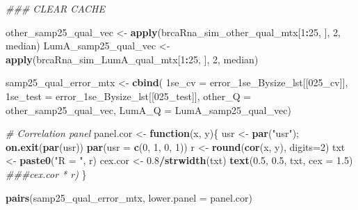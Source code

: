 \documentclass[
]{book}
\newenvironment{Shaded}{\begin{snugshade}}{\end{snugshade}}
\newcommand{\CommentTok}[1]{\textcolor[rgb]{0.56,0.35,0.01}{\textit{#1}}}
\newcommand{\ControlFlowTok}[1]{\textcolor[rgb]{0.13,0.29,0.53}{\textbf{#1}}}
\newcommand{\DataTypeTok}[1]{\textcolor[rgb]{0.13,0.29,0.53}{#1}}
\newcommand{\DecValTok}[1]{\textcolor[rgb]{0.00,0.00,0.81}{#1}}
\newcommand{\FloatTok}[1]{\textcolor[rgb]{0.00,0.00,0.81}{#1}}
\newcommand{\KeywordTok}[1]{\textcolor[rgb]{0.13,0.29,0.53}{\textbf{#1}}}
\newcommand{\NormalTok}[1]{#1}
\newcommand{\OperatorTok}[1]{\textcolor[rgb]{0.81,0.36,0.00}{\textbf{#1}}}
\newcommand{\StringTok}[1]{\textcolor[rgb]{0.31,0.60,0.02}{#1}}
\begin{document}
\begin{Shaded}
\begin{Highlighting}[]
\CommentTok{\#\#\# CLEAR CACHE}


\NormalTok{other\_samp25\_qual\_vec <{-}}\StringTok{ }\KeywordTok{apply}\NormalTok{(brcaRna\_sim\_other\_qual\_mtx[}\DecValTok{1}\OperatorTok{:}\DecValTok{25}\NormalTok{, ], }\DecValTok{2}\NormalTok{, median)}
\NormalTok{LumA\_samp25\_qual\_vec <{-}}\StringTok{ }\KeywordTok{apply}\NormalTok{(brcaRna\_sim\_LumA\_qual\_mtx[}\DecValTok{1}\OperatorTok{:}\DecValTok{25}\NormalTok{, ], }\DecValTok{2}\NormalTok{, median)}

\NormalTok{samp25\_qual\_error\_mtx <{-}}\StringTok{ }\KeywordTok{cbind}\NormalTok{(}
   \StringTok{\textasciigrave{}}\DataTypeTok{1se\_cv}\StringTok{\textasciigrave{}}\NormalTok{ =}\StringTok{ }\NormalTok{error\_1se\_Bysize\_lst[[}\StringTok{\textquotesingle{}025\_cv\textquotesingle{}}\NormalTok{]],}
   \StringTok{\textasciigrave{}}\DataTypeTok{1se\_test}\StringTok{\textasciigrave{}}\NormalTok{ =}\StringTok{ }\NormalTok{error\_1se\_Bysize\_lst[[}\StringTok{\textquotesingle{}025\_test\textquotesingle{}}\NormalTok{]],}
   \StringTok{\textasciigrave{}}\DataTypeTok{other\_Q}\StringTok{\textasciigrave{}}\NormalTok{ =}\StringTok{ }\NormalTok{other\_samp25\_qual\_vec,}
   \StringTok{\textasciigrave{}}\DataTypeTok{LumA\_Q}\StringTok{\textasciigrave{}}\NormalTok{ =}\StringTok{ }\NormalTok{LumA\_samp25\_qual\_vec)}
 

\CommentTok{\# Correlation panel}
\NormalTok{panel.cor <{-}}\StringTok{ }\ControlFlowTok{function}\NormalTok{(x, y)\{}
\NormalTok{    usr <{-}}\StringTok{ }\KeywordTok{par}\NormalTok{(}\StringTok{"usr"}\NormalTok{); }\KeywordTok{on.exit}\NormalTok{(}\KeywordTok{par}\NormalTok{(usr))}
    \KeywordTok{par}\NormalTok{(}\DataTypeTok{usr =} \KeywordTok{c}\NormalTok{(}\DecValTok{0}\NormalTok{, }\DecValTok{1}\NormalTok{, }\DecValTok{0}\NormalTok{, }\DecValTok{1}\NormalTok{))}
\NormalTok{    r <{-}}\StringTok{ }\KeywordTok{round}\NormalTok{(}\KeywordTok{cor}\NormalTok{(x, y), }\DataTypeTok{digits=}\DecValTok{2}\NormalTok{)}
\NormalTok{    txt <{-}}\StringTok{ }\KeywordTok{paste0}\NormalTok{(}\StringTok{"R = "}\NormalTok{, r)}
\NormalTok{    cex.cor <{-}}\StringTok{ }\FloatTok{0.8}\OperatorTok{/}\KeywordTok{strwidth}\NormalTok{(txt)}
    \KeywordTok{text}\NormalTok{(}\FloatTok{0.5}\NormalTok{, }\FloatTok{0.5}\NormalTok{, txt, }\DataTypeTok{cex =} \FloatTok{1.5}\NormalTok{) }\CommentTok{\#\#\#cex.cor * r)}
\NormalTok{\}}

\KeywordTok{pairs}\NormalTok{(samp25\_qual\_error\_mtx,}
 \DataTypeTok{lower.panel =}\NormalTok{ panel.cor)}
\end{Highlighting}
\end{Shaded}
\end{document}
